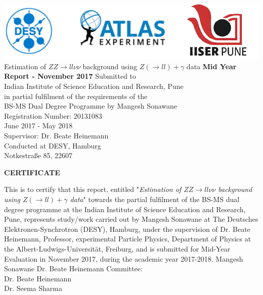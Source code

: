 \documentclass[11pt,a4paper,final]{report}
\begin{document}
\begin{titlepage}
\centering
\vfill
\vfill
\includegraphics[width = \linewidth]{Title_Head.png}
\vspace{1 in}\\
{\huge Estimation of $ZZ \rightarrow ll\nu\nu$ background using $Z(\rightarrow ll)+\gamma$ data}
\vfill
{\LARGE\textbf{Mid Year Report - November 2017}}
\vfill
{\Large Submitted to\\ Indian Institute of Science Education and Research, Pune\\in partial fulfilment of the requirements of the\\ \vspace{0.15cm}BS-MS Dual Degree Programme}
\vfill
{\Large by}
\vfill
{\Large Mangesh Sonawane\\Registration Number: 20131083\\}
\vfill
{\Large June 2017 - May 2018\\}
{\Large Supervisor: Dr. Beate Heinemann\\}
{\Large Conducted at DESY, Hamburg\\\vspace{0.15cm}Notkestra{\ss}e 85, 22607}
\vfill
\vfill
\end{titlepage}
\newpage
\vfill
\begin{center}
\textbf{\LARGE CERTIFICATE}
\end{center}
This is to certify that this report, entitled "\textit{Estimation of $ZZ \to ll\nu\nu$ background using $Z(\to ll)+\gamma$ data}" towards the partial fulfilment of the BS-MS dual degree programme at the Indian Institute of Science Education and Research, Pune, represents study/work carried out by Mangesh Sonawane at The Deutsches Elektronen-Synchrotron (DESY), Hamburg, under the supervision of Dr. Beate Heinemann, Professor, experimental Particle Physics, Department of Physics at the Albert-Ludwigs-Universit{\"a}t, Freiburg, and is submitted for Mid-Year Evaluation in November 2017, during the academic year 2017-2018.
\vfill
Mangesh Sonawane \hfill Dr. Beate Heinemann
\vfill
{\noindent}Committee:\\
Dr. Beate Heinemann\\
Dr. Seema Sharma
\vfill
\newpage
\tableofcontents
\newpage
\end{document}
